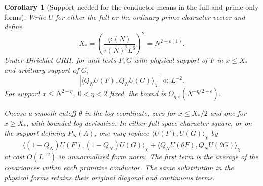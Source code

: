 \documentclass[11pt,a4paper]{article}
\numberwithin{equation}{section}
\newtheorem{corollary}[theorem]{Corollary}
\begin{document}
\begin{corollary}[Support needed for the conductor means in the full and prime-only forms]
\label{cor:conductor-mean-support}
Write $U$ for either the full or the ordinary-prime character
vector and define
\[
 X_*=\left(\frac{\varphi(N)}{\tau(N)^2 L^6}\right)^2
       =N^{2-o(1)}.
\]
Under Dirichlet GRH, for unit tests $F,G$ with physical support
of $F$ in $x\le X_*$ and arbitrary support of $G$,
\begin{equation}
 |\langle Q_NU(F),Q_NU(G)\rangle_\chi|\ll L^{-2}.
 \label{eq:conductor-mean-support}
\end{equation}
For support $x\le N^{2-\eta}$, $0<\eta<2$ fixed, the bound is
$O_{\eta,\epsilon}(N^{-\eta/2+\epsilon})$.

Choose a smooth cutoff $\theta$ in the log coordinate, zero for
$x\le X_*/2$ and one for $x\ge X_*$, with bounded log derivative.
In either full-space character square, or on the support defining
$P_N(A)$, one may replace $\langle U(F),U(G)\rangle_\chi$ by
\[
 \langle(1-Q_N)U(F),(1-Q_N)U(G)\rangle_\chi
 +\langle Q_NU(\theta F),Q_NU(\theta G)\rangle_\chi
\]
at cost $O(L^{-2})$ in unnormalized form norm. The first term is
the average of the covariances within each primitive conductor.
The same substitution in the physical forms retains their original
diagonal and continuous terms.
\end{corollary}
\end{document}
